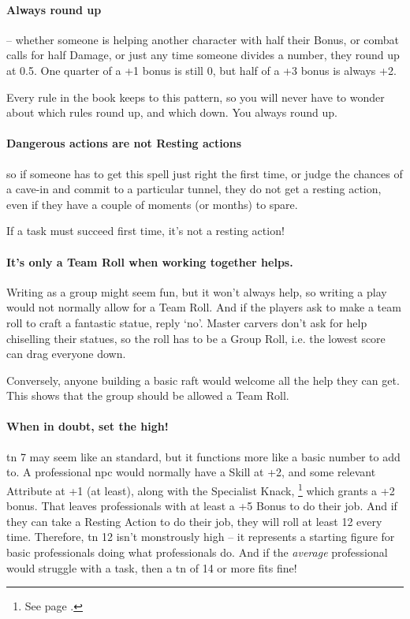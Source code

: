 \begin{multicols}{2}
\begin{scriptsize}
\begin{boxtable}[clXX]
\end{boxtable}
\end{scriptsize}

\paragraph{Always round up} -- whether someone is helping another character with half their Bonus, or combat calls for half Damage, or just any time someone divides a number, they round up at 0.5.
One quarter of a +1 bonus is still 0, but half of a +3 bonus is always +2.

Every rule in the book keeps to this pattern, so you will never have to wonder about which rules round up, and which down.
You always round up.

\paragraph{Dangerous actions are not Resting actions}
so if someone has to get this spell just right the first time, or judge the chances of a cave-in and commit to a particular tunnel, they do not get a resting action, even if they have a couple of moments (or months) to spare.

If a task must succeed first time, it's not a resting action!

\paragraph{It's only a Team Roll when working together helps.}
Writing as a group might seem fun, but it won't always help, so writing a play would not normally allow for a Team Roll.
And if the players ask to make a team roll to craft a fantastic statue, reply `no'.
Master carvers don't ask for help chiselling their statues, so the roll has to be a Group Roll, i.e. the lowest score can drag everyone down.

Conversely, anyone building a basic raft would welcome all the help they can get.
This shows that the group should be allowed a Team Roll.

\paragraph{When in doubt, set the  high!}
\Gls{tn} 7 may seem like an standard, but it functions more like a basic number to add to.
A professional \gls{npc} would normally have a Skill at +2, and some relevant Attribute at +1 (at least), along with the Specialist Knack,%
\footnote{See page \pageref{specialist}.}
which grants a +2 bonus.
That leaves professionals with at least a +5 Bonus to do their job.
And if they can take a Resting Action to do their job, they will roll at least 12 every time.
Therefore, \gls{tn} 12 isn't monstrously high -- it represents a starting figure for basic professionals doing what professionals do.
And if the \emph{average} professional would struggle with a task, then a \gls{tn} of 14 or more fits fine!


\end{multicols}
